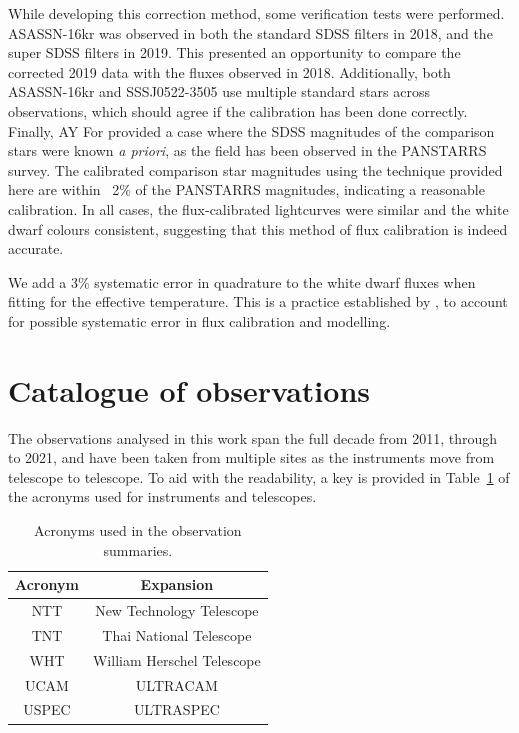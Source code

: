 While developing this correction method, some verification tests were performed.
ASASSN-16kr was observed in both the standard SDSS filters in 2018, and the super SDSS filters in 2019. This presented an opportunity to compare the corrected 2019 data with the fluxes observed in 2018. Additionally, both ASASSN-16kr and SSSJ0522-3505 use multiple standard stars across observations, which should agree if the calibration has been done correctly. Finally, AY For provided a case where the SDSS magnitudes of the comparison stars were known {\it a priori}, as the field has been observed in the PANSTARRS survey. The calibrated comparison star magnitudes using the technique provided here are within ~2\% of the PANSTARRS magnitudes, indicating a reasonable calibration. In all cases, the flux-calibrated lightcurves were similar and the white dwarf colours consistent, suggesting that this method of flux calibration is indeed accurate.

We add a 3\% systematic error in quadrature to the white dwarf fluxes when fitting for the effective temperature. This is a practice established by \citet{McAllister2019}, to account for possible systematic error in flux calibration and modelling.

\newpage
\section{Catalogue of observations}
\label{sect:observing:observation catalogue}

The observations analysed in this work span the full decade from 2011, through to 2021, and have been taken from multiple sites as the instruments move from telescope to telescope. To aid with the readability, a key is provided in Table~\ref{tab:observation acronyms} of the acronyms used for instruments and telescopes.

\begin{table}
    \centering
    \begin{tabular}{c|c}
        Acronym & Expansion \\
        \hline
        NTT & New Technology Telescope \\
        TNT & Thai National Telescope \\
        WHT & William Herschel Telescope \\
        UCAM & ULTRACAM \\
        USPEC & ULTRASPEC \\
    \end{tabular}
    \caption{Acronyms used in the observation summaries.}
    \label{tab:observation acronyms}
\end{table}



